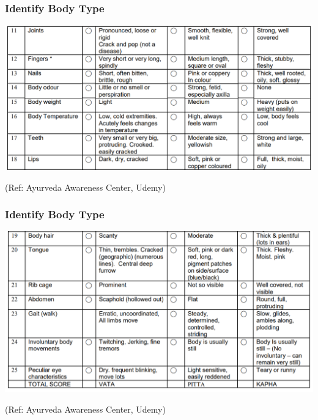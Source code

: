 \begin{frame}[fragile]\frametitle{Identify Body Type}

\begin{center}
\includegraphics[width=\linewidth,keepaspectratio]{images/bt3}
\end{center}

{\tiny (Ref: Ayurveda Awareness Center, Udemy)}

\end{frame}


\begin{frame}[fragile]\frametitle{Identify Body Type}

\begin{center}
\includegraphics[width=\linewidth,keepaspectratio]{images/bt4}
\end{center}

{\tiny (Ref: Ayurveda Awareness Center, Udemy)}

\end{frame}

